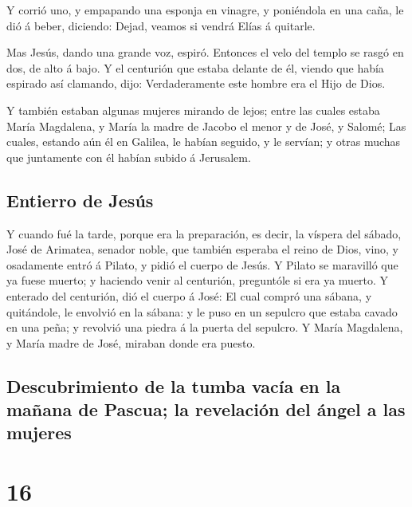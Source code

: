  Y corrió uno, y empapando una esponja en vinagre, y
poniéndola en una caña, le dió á beber, diciendo: Dejad, veamos si
vendrá Elías á quitarle.

 Mas Jesús, dando una grande voz, espiró. 
Entonces el velo del templo se rasgó en dos, de alto á bajo.
 Y el centurión que estaba delante de él, viendo que
había espirado así clamando, dijo: Verdaderamente este hombre era el
Hijo de Dios.

 Y también estaban algunas mujeres mirando de lejos;
entre las cuales estaba María Magdalena, y María la madre de Jacobo el
menor y de José, y Salomé;  Las cuales, estando aún él en
Galilea, le habían seguido, y le servían; y otras muchas que juntamente
con él habían subido á Jerusalem.

\hypertarget{entierro-de-jesuxfas}{%
\subsection{Entierro de Jesús}\label{entierro-de-jesuxfas}}

 Y cuando fué la tarde, porque era la preparación, es
decir, la víspera del sábado,  José de Arimatea, senador
noble, que también esperaba el reino de Dios, vino, y osadamente entró á
Pilato, y pidió el cuerpo de Jesús.  Y Pilato se
maravilló que ya fuese muerto; y haciendo venir al centurión, preguntóle
si era ya muerto.  Y enterado del centurión, dió el
cuerpo á José:  El cual compró una sábana, y quitándole,
le envolvió en la sábana: y le puso en un sepulcro que estaba cavado en
una peña; y revolvió una piedra á la puerta del sepulcro.
 Y María Magdalena, y María madre de José, miraban donde
era puesto.

\hypertarget{descubrimiento-de-la-tumba-vacuxeda-en-la-mauxf1ana-de-pascua-la-revelaciuxf3n-del-uxe1ngel-a-las-mujeres}{%
\subsection{Descubrimiento de la tumba vacía en la mañana de Pascua; la
revelación del ángel a las
mujeres}\label{descubrimiento-de-la-tumba-vacuxeda-en-la-mauxf1ana-de-pascua-la-revelaciuxf3n-del-uxe1ngel-a-las-mujeres}}

\hypertarget{section-15}{%
\section{16}\label{section-15}}

